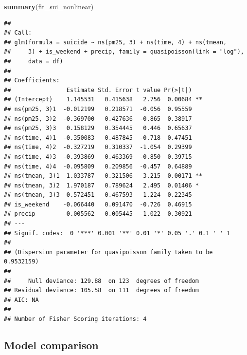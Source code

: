 \documentclass[
]{article}
\newenvironment{Shaded}{\begin{snugshade}}{\end{snugshade}}
\newcommand{\FunctionTok}[1]{\textcolor[rgb]{0.13,0.29,0.53}{\textbf{#1}}}
\newcommand{\NormalTok}[1]{#1}
\begin{document}
\begin{Shaded}
\begin{Highlighting}[]
\FunctionTok{summary}\NormalTok{(fit\_sui\_nonlinear)}
\end{Highlighting}
\end{Shaded}

\begin{verbatim}
## 
## Call:
## glm(formula = suicide ~ ns(pm25, 3) + ns(time, 4) + ns(tmean, 
##     3) + is_weekend + precip, family = quasipoisson(link = "log"), 
##     data = df)
## 
## Coefficients:
##                Estimate Std. Error t value Pr(>|t|)   
## (Intercept)    1.145531   0.415638   2.756  0.00684 **
## ns(pm25, 3)1  -0.012199   0.218571  -0.056  0.95559   
## ns(pm25, 3)2  -0.369700   0.427636  -0.865  0.38917   
## ns(pm25, 3)3   0.158129   0.354445   0.446  0.65637   
## ns(time, 4)1  -0.350083   0.487845  -0.718  0.47451   
## ns(time, 4)2  -0.327219   0.310337  -1.054  0.29399   
## ns(time, 4)3  -0.393869   0.463369  -0.850  0.39715   
## ns(time, 4)4  -0.095809   0.209856  -0.457  0.64889   
## ns(tmean, 3)1  1.033787   0.321506   3.215  0.00171 **
## ns(tmean, 3)2  1.970187   0.789624   2.495  0.01406 * 
## ns(tmean, 3)3  0.572451   0.467593   1.224  0.22345   
## is_weekend    -0.066440   0.091470  -0.726  0.46915   
## precip        -0.005562   0.005445  -1.022  0.30921   
## ---
## Signif. codes:  0 '***' 0.001 '**' 0.01 '*' 0.05 '.' 0.1 ' ' 1
## 
## (Dispersion parameter for quasipoisson family taken to be 0.9532159)
## 
##     Null deviance: 129.88  on 123  degrees of freedom
## Residual deviance: 105.58  on 111  degrees of freedom
## AIC: NA
## 
## Number of Fisher Scoring iterations: 4
\end{verbatim}

\subsection{Model comparison}\label{model-comparison}
\end{document}
